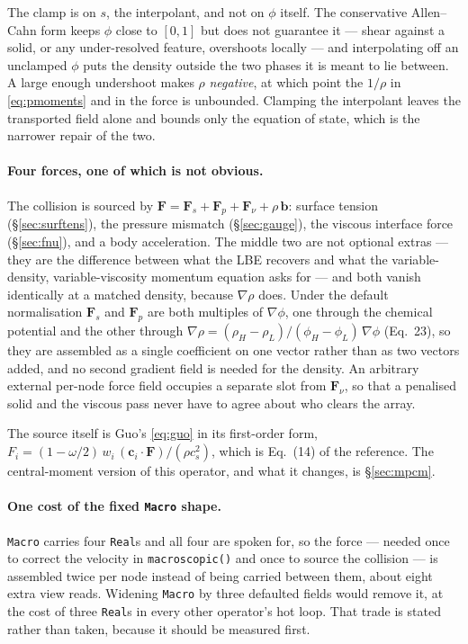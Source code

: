\documentclass[11pt,a4paper]{article}
\newcommand{\code}[1]{\texttt{\small #1}}
\newcommand{\cs}{c_s}
\newcommand{\ci}{\bm{c}_i}
\begin{document}
The clamp is on $s$, the interpolant, and not on $\phi$ itself. The conservative
Allen--Cahn form keeps $\phi$ close to $[0,1]$ but does not guarantee it --- shear
against a solid, or any under-resolved feature, overshoots locally --- and
interpolating off an unclamped $\phi$ puts the density outside the two phases it
is meant to lie between. A large enough undershoot makes $\rho$ \emph{negative},
at which point the $1/\rho$ in \eqref{eq:pmoments} and in the force is unbounded.
Clamping the interpolant leaves the transported field alone and bounds only the
equation of state, which is the narrower repair of the two.

\paragraph{Four forces, one of which is not obvious.} The collision is sourced by
$\bm{F} = \bm{F}_s + \bm{F}_p + \bm{F}_\nu + \rho\,\bm{b}$: surface tension
(\S\ref{sec:surftens}), the pressure mismatch (\S\ref{sec:gauge}), the viscous
interface force (\S\ref{sec:fnu}), and a body acceleration. The middle two are
not optional extras --- they are the difference between what the LBE recovers and
what the variable-density, variable-viscosity momentum equation asks for --- and
both vanish identically at a matched density, because $\nabla\rho$ does. Under the
default normalisation $\bm{F}_s$ and $\bm{F}_p$ are both multiples of
$\nabla\phi$, one through the chemical potential and the other through
$\nabla\rho = (\rho_H-\rho_L)/(\phi_H-\phi_L)\,\nabla\phi$ (Eq.~23), so they are
assembled as a single coefficient on one vector rather than as two vectors added,
and no second gradient field is needed for the density. An arbitrary external
per-node force field occupies a separate slot from $\bm{F}_\nu$, so that a
penalised solid and the viscous pass never have to agree about who clears the
array.

The source itself is Guo's \eqref{eq:guo} in its first-order form,
$F_i = (1-\omega/2)\,w_i\,(\ci\!\cdot\!\bm{F})/(\rho\cs^2)$, which is Eq.~(14) of
the reference. The central-moment version of this operator, and what it changes,
is \S\ref{sec:mpcm}.

\paragraph{One cost of the fixed \code{Macro} shape.} \code{Macro} carries four
\code{Real}s and all four are spoken for, so the force --- needed once to correct
the velocity in \code{macroscopic()} and once to source the collision --- is
assembled twice per node instead of being carried between them, about eight extra
view reads. Widening \code{Macro} by three defaulted fields would remove it, at
the cost of three \code{Real}s in every other operator's hot loop. That trade is
stated rather than taken, because it should be measured first.
\end{document}
